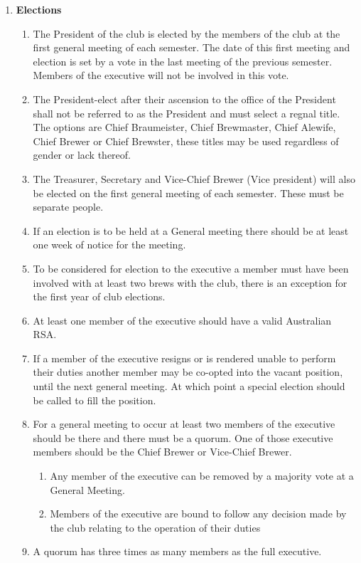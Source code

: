 \documentclass{article}
\begin{document}
\begin{enumerate}[label=\textbf{\arabic*}]
    \item \textbf{Elections}
    \begin{enumerate}[label=4.\arabic*]
        \item The President of the club is elected by the members of the club at the first general meeting of each semester. The date of this first meeting and election is set by a vote in the last meeting of the previous semester. Members of the executive will not be involved in this vote.
        \item The President-elect after their ascension to the office of the President shall not be referred to as the President and must select a regnal title. The options are Chief Braumeister, Chief Brewmaster, Chief Alewife, Chief Brewer or Chief Brewster, these titles may be used regardless of gender or lack thereof.
        \item The Treasurer, Secretary and Vice-Chief Brewer (Vice president) will also be elected on the first general meeting of each semester. These must be separate people.
        \item If an election is to be held at a General meeting there should be at least one week of notice for the meeting.
        \item To be considered for election to the executive a member must have been involved with at least two brews with the club, there is an exception for the first year of club elections.
        \item At least one member of the executive should have a valid Australian RSA.
        \item If a member of the executive resigns or is rendered unable to perform their duties another member may be co-opted into the vacant position, until the next general meeting. At which point a special election should be called to fill the position.
        \item For a general meeting to occur at least two members of the executive should be there and there must be a quorum. One of those executive members should be the Chief Brewer or Vice-Chief Brewer.
        \begin{enumerate}[label=\alph*.]
            \item Any member of the executive can be removed by a majority vote at a General Meeting.
            \item Members of the executive are bound to follow any decision made by the club relating to the operation of their duties
        \end{enumerate}
        \item A quorum has three times as many members as the full executive.
    \end{enumerate}


\end{enumerate}
\end{document}
